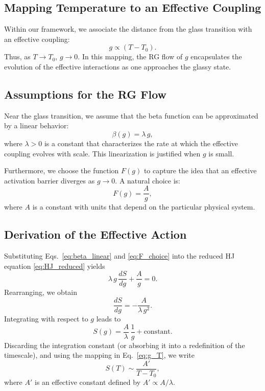 \documentclass[12pt]{article}
\begin{document}
\subsection{Mapping Temperature to an Effective Coupling}
Within our framework, we associate the distance from the glass transition with an effective coupling:
\begin{equation} \label{eq:g_T}
g \propto (T-T_0).
\end{equation}
Thus, as \(T \to T_0\), \(g \to 0\). In this mapping, the RG flow of \(g\) encapsulates the evolution of the effective interactions as one approaches the glassy state.

\subsection{Assumptions for the RG Flow}
Near the glass transition, we assume that the beta function can be approximated by a linear behavior:
\begin{equation} \label{eq:beta_linear}
\beta(g) = \lambda\, g,
\end{equation}
where \(\lambda>0\) is a constant that characterizes the rate at which the effective coupling evolves with scale. This linearization is justified when \(g\) is small.

Furthermore, we choose the function \(F(g)\) to capture the idea that an effective activation barrier diverges as \(g\to 0\). A natural choice is:
\begin{equation} \label{eq:F_choice}
F(g) = \frac{A}{g},
\end{equation}
where \(A\) is a constant with units that depend on the particular physical system.

\subsection{Derivation of the Effective Action}
Substituting Eqs.~\eqref{eq:beta_linear} and \eqref{eq:F_choice} into the reduced HJ equation \eqref{eq:HJ_reduced} yields
\begin{equation} \label{eq:HJ_reduced2}
\lambda\, g\, \frac{dS}{dg} + \frac{A}{g} = 0.
\end{equation}
Rearranging, we obtain
\begin{equation} \label{eq:dSdg}
\frac{dS}{dg} = -\frac{A}{\lambda\, g^2}.
\end{equation}
Integrating with respect to \(g\) leads to
\begin{equation} \label{eq:Sg}
S(g) = \frac{A}{\lambda}\,\frac{1}{g} + \text{constant}.
\end{equation}
Discarding the integration constant (or absorbing it into a redefinition of the timescale), and using the mapping in Eq.~\eqref{eq:g_T}, we write
\begin{equation} \label{eq:ST}
S(T) \sim \frac{A'}{T-T_0},
\end{equation}
where \(A'\) is an effective constant defined by \(A' \propto A/\lambda\).
\end{document}
